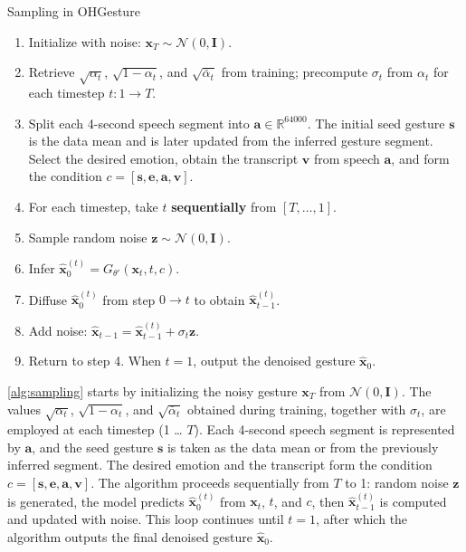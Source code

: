 \begin{algorithm}[H]
	\caption{Sampling in OHGesture}
	\label{alg:sampling}
	\setlength{\baselineskip}{10pt}
	\begin{enumerate}
		\item Initialize with noise: $\mathbf{x}_T \sim \mathcal{N}(0, \mathbf{I})$.
		\item Retrieve $\sqrt{\alpha_t}$, $\sqrt{1 - \alpha_t}$, and $\sqrt{\bar{\alpha}_t}$ from training; precompute $\sigma_t$ from $\alpha_t$ for each timestep $t: 1 \rightarrow T$.
		\item Split each 4-second speech segment into $\mathbf{a} \in \mathbb{R}^{64000}$.  
		The initial seed gesture $\mathbf{s}$ is the data mean and is later updated from the inferred gesture segment.  
		Select the desired emotion, obtain the transcript $\mathbf{v}$ from speech $\mathbf{a}$, and form the condition $c = [\mathbf{s}, \mathbf{e}, \mathbf{a}, \mathbf{v}]$.
		\item For each timestep, take $t$ \textbf{sequentially} from $[T, \dots, 1]$.
		\item Sample random noise $\mathbf{z} \sim \mathcal{N}(0, \mathbf{I})$.
		\item Infer $\hat{\mathbf{x}}_0^{(t)} = G_{\theta'}(\mathbf{x}_t, t, c)$.
		\item Diffuse $\hat{\mathbf{x}}_0^{(t)}$ from step $0 \rightarrow t$ to obtain $\hat{\mathbf{x}}_{t-1}^{(t)}$.
		\item Add noise: $\hat{\mathbf{x}}_{t-1} = \hat{\mathbf{x}}_{t-1}^{(t)} + \sigma_t \mathbf{z}$.
		\item Return to step 4.  
		When $t = 1$, output the denoised gesture $\hat{\mathbf{x}}_0$.
	\end{enumerate}
\end{algorithm}
\autoref{alg:sampling} starts by initializing the noisy gesture $\mathbf{x}_T$ from $\mathcal{N}(0, \mathbf{I})$.  
The values $\sqrt{\alpha_t}$, $\sqrt{1-\alpha_t}$, and $\sqrt{\bar{\alpha}_t}$ obtained during training, together with $\sigma_t$, are employed at each timestep (1 … $T$).  
Each 4-second speech segment is represented by $\mathbf{a}$, and the seed gesture $\mathbf{s}$ is taken as the data mean or from the previously inferred segment.  
The desired emotion and the transcript form the condition $c = [\mathbf{s}, \mathbf{e}, \mathbf{a}, \mathbf{v}]$.  
The algorithm proceeds sequentially from $T$ to 1: random noise $\mathbf{z}$ is generated, the model predicts $\hat{\mathbf{x}}_0^{(t)}$ from $\mathbf{x}_t$, $t$, and $c$, then $\hat{\mathbf{x}}_{t-1}^{(t)}$ is computed and updated with noise.  
This loop continues until $t=1$, after which the algorithm outputs the final denoised gesture $\hat{\mathbf{x}}_0$.
